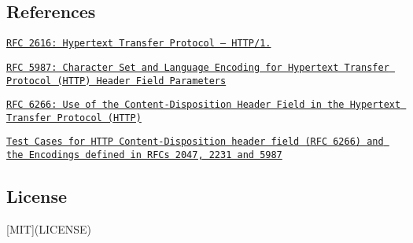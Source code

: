 

\subsection*{References}


\begin{DoxyItemize}
\item \href{https://tools.ietf.org/html/rfc2616}{\tt R\+FC 2616\+: Hypertext Transfer Protocol -- H\+T\+T\+P/1.}
\item \href{https://tools.ietf.org/html/rfc5987}{\tt R\+FC 5987\+: Character Set and Language Encoding for Hypertext Transfer Protocol (H\+T\+TP) Header Field Parameters}
\item \href{https://tools.ietf.org/html/rfc6266}{\tt R\+FC 6266\+: Use of the Content-\/\+Disposition Header Field in the Hypertext Transfer Protocol (H\+T\+TP)}
\item \href{http://greenbytes.de/tech/tc2231/}{\tt Test Cases for H\+T\+TP Content-\/\+Disposition header field (R\+FC 6266) and the Encodings defined in R\+F\+Cs 2047, 2231 and 5987}
\end{DoxyItemize}

\subsection*{License}

\mbox{[}M\+IT\mbox{]}(L\+I\+C\+E\+N\+SE) 